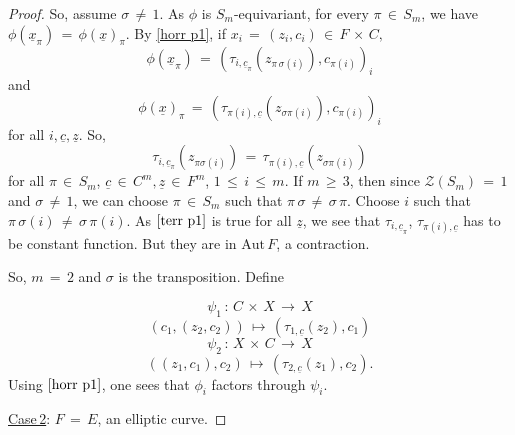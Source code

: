 \documentclass[10pt,a4paper]{amsart}
\theoremstyle{plain}
\theoremstyle{definition}
\theoremstyle{remark}
\begin{document}
\begin{proof}
So, assume $\sigma\,\neq\,1$. As $\phi$ is $S_m$-equivariant, for every $\pi\,\in\,S_{m}$, we have $\phi(\underline{x}_{\pi})\,=\, \phi(\underline{x})_{\pi}$. By \eqref{horr p1}, if $x_{i}\,=\, (z_{i},c_{i})\,\in\,F\,\times\, C,$
\begin{equation*}
\phi(\underline{x}_{\pi})\,=\, (\tau_{i, \underline{c}_{\pi}}(z_{\pi\,\sigma(i)}), c_{\pi(i)})_{i}     
\end{equation*}
and
\begin{equation*}
\phi(\underline{x})_{\pi}\,=\, (\tau_{\pi(i),\underline{c}}(z_{\sigma \pi{(i)}}), c_{\pi(i)})_i  
\end{equation*}
for all $i,\underline{c}, \underline{z}$. So, 
\begin{equation}\label{terr p1}
\tau_{i, \underline{c}_{\pi}}(z_{\pi\sigma{(i)}})\,=\, \tau_{\pi(i),\underline{c}}(z_{\sigma\pi(i)})  
\end{equation}
for all $\pi\,\in\, S_{m}$, $\underline{c}\,\in\, C^{m}, \underline{z}\,\in\,F^{m}$, $1\,\leq\, i\,\leq\, m$. If $m\,\geq\,3$, then since $\mathcal{Z}(S_{m})\,=\, 1$ and $\sigma\,\neq\, 1$, we can choose $\pi\,\in\, S_{m}$ such that $\pi\,\sigma\,\neq\, \sigma\,\pi$. Choose $i$ such that $\pi\,\sigma(i)\,\neq\,\sigma\,\pi(i)$. As $\eqref{terr p1}$ is true for all $\underline{z}$, we see that $\tau_{i,\underline{c}_{\pi}}$, $\tau_{\pi(i),\underline{c}}$ has to be constant function. But they are in $\textrm{Aut}\,F$, a contraction. 

So, $m\,=\,2$ and $\sigma$ is the transposition. Define


\begin{equation*}
\psi_{1}\,:\, C\,\times \,X\,\longrightarrow\, X    
\end{equation*}
\begin{equation*}
(c_{1},(z_{2}, c_{2}))\,\longmapsto\, (\tau_{1,\underline{c}}(z_{2}),c_{1})    
\end{equation*}
\begin{equation*}
\psi_{2}\,:\, X\,\times\,C\,\longrightarrow\, X    
\end{equation*}
\begin{equation*}
((z_{1},c_{1}), c_{2})\,\longmapsto\, (\tau_{2,\underline{c}}(z_{1}), c_{2}).    
\end{equation*}
Using $\eqref{horr p1}$, one sees that $\phi_{i}$ factors through $\psi_{i}$.


\underline{Case\,2}: $F\,=\, E$, an elliptic curve.


\end{proof}
\end{document}
